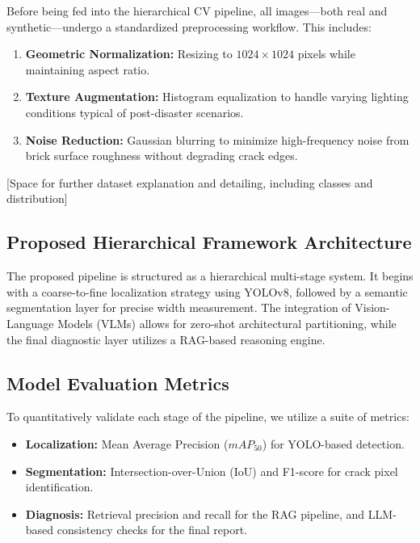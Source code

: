 \begin{sloppypar}
Before being fed into the hierarchical CV pipeline, all images—both real and synthetic—undergo a standardized preprocessing workflow. This includes:
\begin{enumerate}
    \item \textbf{Geometric Normalization:} Resizing to $1024 \times 1024$ pixels while maintaining aspect ratio.
    \item \textbf{Texture Augmentation:} Histogram equalization to handle varying lighting conditions typical of post-disaster scenarios.
    \item \textbf{Noise Reduction:} Gaussian blurring to minimize high-frequency noise from brick surface roughness without degrading crack edges.
\end{enumerate}
\end{sloppypar}

\begin{sloppypar}
[Space for further dataset explanation and detailing, including classes and distribution]
\end{sloppypar}

\subsection{Proposed Hierarchical Framework Architecture}
\label{subsec:architecture}

\begin{sloppypar}
The proposed pipeline is structured as a hierarchical multi-stage system. It begins with a coarse-to-fine localization strategy using YOLOv8, followed by a semantic segmentation layer for precise width measurement. The integration of Vision-Language Models (VLMs) allows for zero-shot architectural partitioning, while the final diagnostic layer utilizes a RAG-based reasoning engine.
\end{sloppypar}

\subsection{Model Evaluation Metrics}
\label{subsec:metrics}

\begin{sloppypar}
To quantitatively validate each stage of the pipeline, we utilize a suite of metrics:
\begin{itemize}
    \item \textbf{Localization:} Mean Average Precision ($mAP_{50}$) for YOLO-based detection.
    \item \textbf{Segmentation:} Intersection-over-Union (IoU) and F1-score for crack pixel identification.
    \item \textbf{Diagnosis:} Retrieval precision and recall for the RAG pipeline, and LLM-based consistency checks for the final report.
\end{itemize}
\end{sloppypar}

